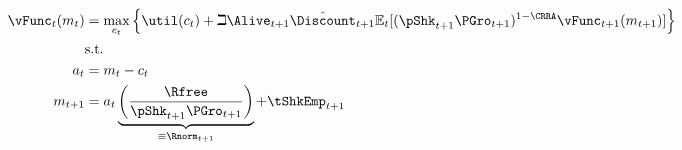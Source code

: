    \begin{equation*}\begin{gathered}\begin{aligned}
      {\vFunc}_{t}({m}_{t})  & = \max_{{c}_{t}} \left\{\util({c}_{t})+\beth\Alive_{t+1}\hat{\Discount}_{t+1}
                                  \Ex_{t}[(\pShk_{t+1}\PGro_{t+1})^{1-\CRRA}{\vFunc}_{t+1}({m}_{t+1})] \right\}   \\
                            & \text{s.t.} &     \\
      {a}_{t}    & = {m}_{t}-{c}_{t}
      \\      {m}_{t+1}  & = {a}_{t}\underbrace{\left(\frac{\Rfree}{\pShk_{t+1}\PGro_{t+1}}\right)}_{\equiv \Rnorm_{t+1}}+\tShkEmp_{t+1}
    \end{aligned}\end{gathered}\end{equation*}
  
